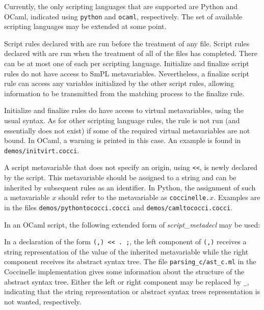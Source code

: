 Currently, the only scripting languages that are supported are Python and
OCaml, indicated using {\tt python} and {\tt ocaml}, respectively.  The
set of available scripting languages may be extended at some point.

Script rules declared with  are run before the treatment of
any file.  Script rules declared with  are run when the
treatment of all of the files has completed.  There can be at most one of
each per scripting language.
Initialize and finalize script rules do not have access to SmPL
metavariables.  Nevertheless, a finalize script rule can access any
variables initialized by the other script rules, allowing information to be
transmitted from the matching process to the finalize rule.

Initialize and finalize rules do have access to virtual metavariables,
using the usual syntax.  As for other scripting language rules, the rule
is not run (and essentially does not exist) if some of the required virtual
metavariables are not bound.  In OCaml, a warning is printed in this case.
An example is found in {\tt demos/initvirt.cocci}.

A script metavariable that does not specify an origin, using \texttt{<<},
is newly declared by the script.  This metavariable should be assigned to a
string and can be inherited by subsequent rules as an identifier.  In
Python, the assignment of such a metavariable $x$ should refer to the
metavariable as {\tt coccinelle.\(x\)}.  Examples are in the files
\texttt{demos/pythontococci.cocci} and \texttt{demos/camltococci.cocci}.

In an OCaml script, the following extended form of \textit{script\_metadecl}
may be used:

\begin{grammar}
\end{grammar}

\noindent
In a declaration of the form \texttt{(,) <{}<
  . ;}, the left component of \texttt{(,)}
receives a string representation of the value of the inherited metavariable
while the right component receives its abstract syntax tree.  The file
\texttt{parsing\_c/ast\_c.ml} in the Coccinelle implementation gives some
information about the structure of the abstract syntax tree.  Either the
left or right component may be replaced by \verb+_+, indicating that the
string representation or abstract syntax trees representation is not
wanted, respectively.

